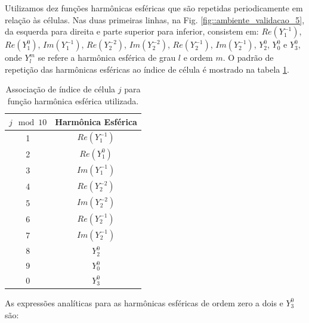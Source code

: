 Utilizamos dez funções harmônicas esféricas que são repetidas periodicamente em relação às células. Nas duas primeiras linhas, na Fig. \ref{fig::ambiente_validacao_5}, da esquerda para direita e parte superior para inferior, consistem em: $Re(Y_1^{-1})$,
$Re(Y_1^0)$,
$Im(Y_1^{-1})$,
$Re(Y_2^{-2})$,
$Im(Y_2^{-2})$,
$Re(Y_2^{-1})$,
$Im(Y_2^{-1})$,
$Y_2^0$,
$Y_0^0$ e
$Y_3^0$, onde $Y_l^m$ se refere a harmônica esférica de grau $l$ e ordem $m$. O padrão de repetição das harmônicas esféricas ao índice de célula é mostrado na tabela \ref{tab::harmonicas_esfericas}.

\begin{table}[ht]
\centering
\begin{tabular}{cc}
$j \mod 10$ & Harmônica Esférica \\ \hline
1 & $Re(Y_1^{-1})$  \\
2 & $Re(Y_1^0)$     \\
3 & $Im(Y_1^{-1})$  \\
4 & $Re(Y_2^{-2})$  \\
5 & $Im(Y_2^{-2})$  \\
6 & $Re(Y_2^{-1})$  \\
7 & $Im(Y_2^{-1})$  \\
8 & $Y_2^0$         \\
9 & $Y_0^0$         \\
0 & $Y_3^0$        
\end{tabular}
\caption{Associação de índice de célula $j$ para função harmônica esférica utilizada.}
\label{tab::harmonicas_esfericas}
\end{table}

As expressões analíticas para as harmônicas esféricas de ordem zero a dois e $Y_3^0$ são:

